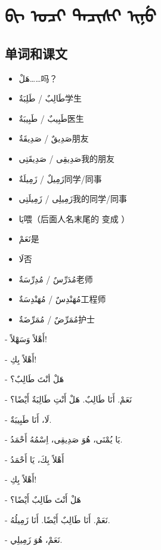 \chapter{\textmongolian{ᠪᡳ ᠣᠴᡳ ᡨᠠᠴᡳᠰᡳ ᡳᠨᡠ}}

\section{ 单词和课文}

\begin{itemize}
    \item \ac{هَلْ}{……吗？}
    \item \ac{طَالِبٌ / طَلِبَةٌ}{学生}
    \item \ac{طَبِيبٌ / طَبِيبَةٌ}{医生}
    \item \ac{صَدِيقٌ / صَدِيقَةٌ}{朋友}
    \item \ac{صَدِيقِى / صَدِيقَتِى}{我的朋友}
    \item \ac{زَمِيلٌ / زَمِيلَةٌ}{同学/同事}
    \item \ac{زَمِيلِى / زَمِيلَتِى}{我的同学/同事}
    \item \ac{يَا}{喂（后面人名末尾的  变成 ）}
    \item \ac{نَعَمْ}{是}
    \item \ac{لَا}{否}
    \item \ac{مُدَرِّسٌ / مُدِرِّسَةٌ}{老师}
    \item \ac{مُهَنْدِسٌ / مُهَنْدِسَةٌ}{工程师}
    \item \ac{مُمَرِّضٌ / مُمَرِّضَةٌ}{护士}
\end{itemize}

\begin{Arabic}
    - أَهْلاً وَسَهْلاً!

    - أَهْلاً بِكِ!

    - هَلْ أنْتَ طَالِبٌ؟

    - نَعَمْ. أَنَا طَالِبٌ. هَلْ أَنْتِ طَالِبَةٌ أَيْضًا؟

    - لَا، أَنَا طَبِيبَةٌ.

    - يَا يُمْنَى، هُوَ صَدِيقِى، اِسْمُهُ أَحْمَدُ.

    - أَهْلاً بِكَ، يَا أَحْمَدُ

    - أَهْلاً بِكِ!

    - هَلْ أَنْتَ طَالِبٌ أَيْضًا؟

    - نَعَمْ. أَنَا طَالِبٌ أَيْضًا. أَنَا زَمِيلُهُ.

    - نَعَمْ، هُوَ زَمِيلِي.
\end{Arabic}

